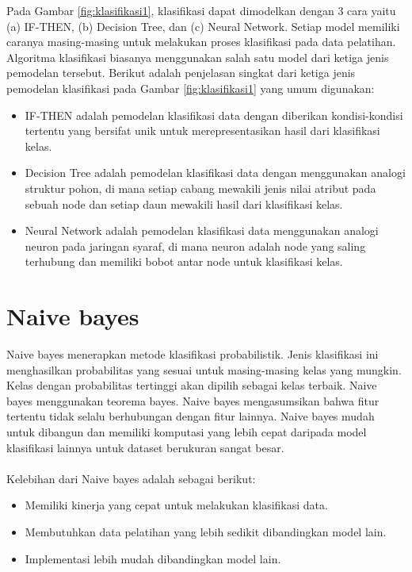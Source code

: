 \noindent Pada Gambar \ref{fig:klasifikasi1}, klasifikasi dapat dimodelkan dengan 3 cara yaitu (a) IF-THEN, (b) Decision Tree, dan (c) Neural Network. Setiap model memiliki caranya masing-masing untuk melakukan proses klasifikasi pada data pelatihan. Algoritma klasifikasi biasanya  menggunakan salah satu model dari ketiga jenis pemodelan tersebut. Berikut adalah penjelasan singkat dari ketiga jenis pemodelan klasifikasi  pada Gambar \ref{fig:klasifikasi1} yang umum digunakan: 

\begin{itemize}
\item IF-THEN adalah pemodelan klasifikasi data dengan diberikan kondisi-kondisi tertentu yang bersifat unik  untuk merepresentasikan hasil dari klasifikasi kelas.
\item Decision Tree adalah pemodelan klasifikasi data dengan menggunakan analogi struktur pohon, di mana setiap cabang mewakili jenis nilai atribut pada sebuah node dan setiap daun mewakili hasil dari klasifikasi kelas.
\item Neural Network adalah pemodelan klasifikasi data menggunakan analogi neuron pada jaringan syaraf, di mana neuron adalah node yang saling terhubung dan memiliki bobot antar node untuk klasifikasi kelas.
\end{itemize}

\newpage
\section{Naive bayes}
\par Naive bayes menerapkan metode klasifikasi probabilistik. Jenis klasifikasi ini menghasilkan probabilitas yang sesuai untuk masing-masing kelas yang mungkin. Kelas dengan probabilitas tertinggi akan dipilih sebagai kelas terbaik. Naive bayes menggunakan teorema bayes. Naive bayes mengasumsikan bahwa fitur tertentu tidak selalu berhubungan dengan fitur lainnya. Naive bayes mudah untuk dibangun dan memiliki komputasi yang lebih cepat daripada model klasifikasi lainnya untuk dataset berukuran sangat besar. 
\\\\
\noindent Kelebihan dari Naive bayes adalah sebagai berikut:

\begin{itemize}
\item Memiliki kinerja yang cepat untuk melakukan klasifikasi data.
\item Membutuhkan data pelatihan yang lebih sedikit dibandingkan model lain.
\item Implementasi lebih mudah dibandingkan model lain.
\end{itemize}

